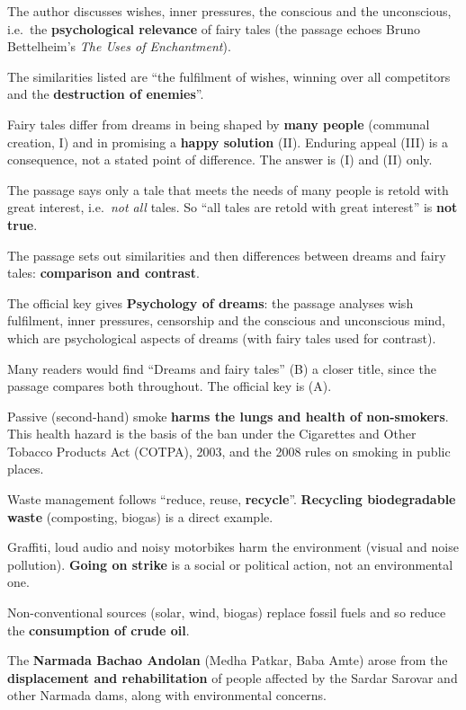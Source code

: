 The author discusses wishes, inner pressures, the conscious and the unconscious, i.e.\ the \textbf{psychological relevance} of fairy tales (the passage echoes Bruno Bettelheim's \emph{The Uses of Enchantment}).

The similarities listed are ``the fulfilment of wishes, winning over all competitors and the \textbf{destruction of enemies}''.

Fairy tales differ from dreams in being shaped by \textbf{many people} (communal creation, I) and in promising a \textbf{happy solution} (II). Enduring appeal (III) is a consequence, not a stated point of difference. The answer is (I) and (II) only.

The passage says only a tale that meets the needs of many people is retold with great interest, i.e.\ \emph{not all} tales. So ``all tales are retold with great interest'' is \textbf{not true}.

The passage sets out similarities and then differences between dreams and fairy tales: \textbf{comparison and contrast}.

The official key gives \textbf{Psychology of dreams}: the passage analyses wish fulfilment, inner pressures, censorship and the conscious and unconscious mind, which are psychological aspects of dreams (with fairy tales used for contrast).

Many readers would find ``Dreams and fairy tales'' (B) a closer title, since the passage compares both throughout. The official key is (A).

Passive (second-hand) smoke \textbf{harms the lungs and health of non-smokers}. This health hazard is the basis of the ban under the Cigarettes and Other Tobacco Products Act (COTPA), 2003, and the 2008 rules on smoking in public places.

Waste management follows ``reduce, reuse, \textbf{recycle}''. \textbf{Recycling biodegradable waste} (composting, biogas) is a direct example.

Graffiti, loud audio and noisy motorbikes harm the environment (visual and noise pollution). \textbf{Going on strike} is a social or political action, not an environmental one.

Non-conventional sources (solar, wind, biogas) replace fossil fuels and so reduce the \textbf{consumption of crude oil}.

The \textbf{Narmada Bachao Andolan} (Medha Patkar, Baba Amte) arose from the \textbf{displacement and rehabilitation} of people affected by the Sardar Sarovar and other Narmada dams, along with environmental concerns.

